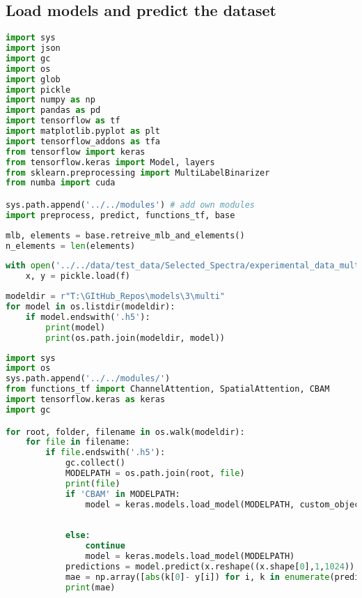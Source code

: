 \hypertarget{load-models-and-predict-the-dataset}{%
\subsection*{Load models and predict the
dataset}\label{load-models-and-predict-the-dataset}}

\begin{lstlisting}[language=Python]
import sys
import json
import gc
import os
import glob
import pickle
import numpy as np
import pandas as pd
import tensorflow as tf
import matplotlib.pyplot as plt
import tensorflow_addons as tfa
from tensorflow import keras
from tensorflow.keras import Model, layers
from sklearn.preprocessing import MultiLabelBinarizer
from numba import cuda

sys.path.append('../../modules') # add own modules
import preprocess, predict, functions_tf, base
\end{lstlisting}

\begin{lstlisting}[language=Python]
mlb, elements = base.retreive_mlb_and_elements()
n_elements = len(elements)
\end{lstlisting}

\begin{lstlisting}[language=Python]
with open('../../data/test_data/Selected_Spectra/experimental_data_multi.pkl', 'rb') as f:
    x, y = pickle.load(f)
\end{lstlisting}

\begin{lstlisting}[language=Python]
modeldir = r"T:\GItHub_Repos\models\3\multi"
for model in os.listdir(modeldir):
    if model.endswith('.h5'):
        print(model)
        print(os.path.join(modeldir, model))
\end{lstlisting}

\begin{lstlisting}[language=Python]
import sys
import os
sys.path.append('../../modules/')
from functions_tf import ChannelAttention, SpatialAttention, CBAM
import tensorflow.keras as keras
import gc

for root, folder, filename in os.walk(modeldir):
    for file in filename:
        if file.endswith('.h5'):
            gc.collect()
            MODELPATH = os.path.join(root, file)
            print(file)
            if 'CBAM' in MODELPATH:
                model = keras.models.load_model(MODELPATH, custom_objects={'ChannelAttention': ChannelAttention,
                                                                           'SpatialAttention': SpatialAttention,
                                                                           'CBAM': CBAM})
            else:
                continue
                model = keras.models.load_model(MODELPATH)
            predictions = model.predict(x.reshape((x.shape[0],1,1024)), verbose=1)
            mae = np.array([abs(k[0]- y[i]) for i, k in enumerate(predictions)]).mean()
            print(mae)
            
\end{lstlisting}

